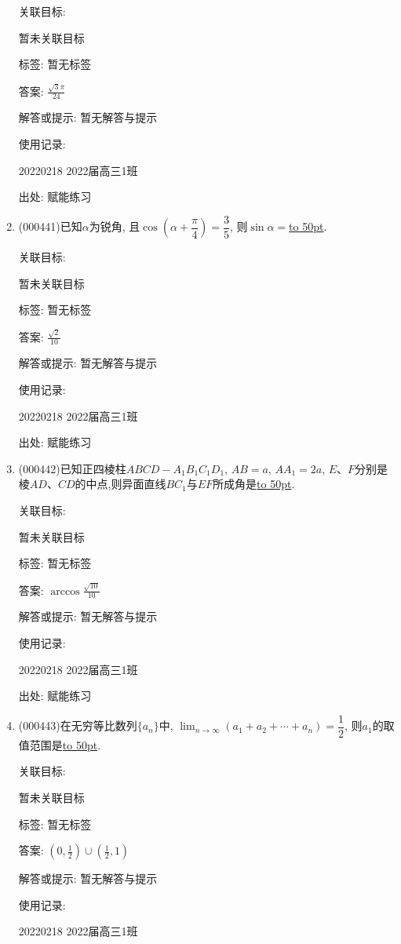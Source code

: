 \documentclass[10pt,a4paper]{article}
\newcommand{\blank}[1]{\underline{\hbox to #1pt{}}}
\begin{document}
\begin{enumerate}[1.]
关联目标:

暂未关联目标



标签: 暂无标签

答案: $\frac{\sqrt 3\pi }{24}$

解答或提示: 暂无解答与提示

使用记录:

20220218	2022届高三1班	


出处: 赋能练习
\item { (000441)}已知$\alpha$为锐角, 且$\cos (\alpha +\dfrac\pi 4)=\dfrac35$, 则$\sin \alpha =$\blank{50}.


关联目标:

暂未关联目标



标签: 暂无标签

答案: $\frac{\sqrt 2}{10}$

解答或提示: 暂无解答与提示

使用记录:

20220218	2022届高三1班	


出处: 赋能练习
\item { (000442)}已知正四棱柱$ABCD-A_1B_1C_1D_1$, $AB=a$, $AA_1=2a$, $E$、$F$分别是棱$AD$、$CD$的中点,则异面直线$BC_1$与$EF$所成角是\blank{50}.


关联目标:

暂未关联目标



标签: 暂无标签

答案: $\arccos \frac{\sqrt{10}}{10}$

解答或提示: 暂无解答与提示

使用记录:

20220218	2022届高三1班	


出处: 赋能练习
\item { (000443)}在无穷等比数列$\{a_n\}$中, $\displaystyle\lim_{n\to\infty}(a_1+a_2+\cdots+a_n)=\dfrac12$, 则$a_1$的取值范围是\blank{50}.


关联目标:

暂未关联目标



标签: 暂无标签

答案: $(0,\frac 12)\cup (\frac 12,1)$

解答或提示: 暂无解答与提示

使用记录:

20220218	2022届高三1班	



\end{enumerate}
\end{document}
